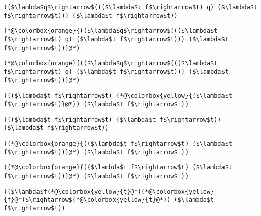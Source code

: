 \documentclass{beamer}
\begin{document}
\begin{frame}[fragile]{\CurrentSection}
\lstset{basicstyle=\ttfamily\small}\lstset{numbers=none}\lstset{language=ML}\begin{lstlisting}
(($\lambda$q$\rightarrow$((($\lambda$t f$\rightarrow$t) q) ($\lambda$t f$\rightarrow$t))) ($\lambda$t f$\rightarrow$t))
\end{lstlisting}
\pause\lstset{language=ML}\begin{lstlisting}
(*@\colorbox{orange}{(($\lambda$q$\rightarrow$((($\lambda$t f$\rightarrow$t) q) ($\lambda$t f$\rightarrow$t))) ($\lambda$t f$\rightarrow$t))}@*)
\end{lstlisting}

\end{frame}

\begin{frame}[fragile]{\CurrentSection}
\lstset{basicstyle=\ttfamily\small}\lstset{numbers=none}\lstset{language=ML}\begin{lstlisting}
(*@\colorbox{orange}{(($\lambda$q$\rightarrow$((($\lambda$t f$\rightarrow$t) q) ($\lambda$t f$\rightarrow$t))) ($\lambda$t f$\rightarrow$t))}@*)
\end{lstlisting}
\pause\lstset{language=ML}\begin{lstlisting}
((($\lambda$t f$\rightarrow$t) (*@\colorbox{yellow}{($\lambda$t f$\rightarrow$t)}@*)) ($\lambda$t f$\rightarrow$t))
\end{lstlisting}

\end{frame}

\begin{frame}[fragile]{\CurrentSection}
\lstset{basicstyle=\ttfamily\small}\lstset{numbers=none}\lstset{language=ML}\begin{lstlisting}
((($\lambda$t f$\rightarrow$t) ($\lambda$t f$\rightarrow$t)) ($\lambda$t f$\rightarrow$t))
\end{lstlisting}
\pause\lstset{language=ML}\begin{lstlisting}
((*@\colorbox{orange}{(($\lambda$t f$\rightarrow$t) ($\lambda$t f$\rightarrow$t))}@*) ($\lambda$t f$\rightarrow$t))
\end{lstlisting}

\end{frame}

\begin{frame}[fragile]{\CurrentSection}
\lstset{basicstyle=\ttfamily\small}\lstset{numbers=none}\lstset{language=ML}\begin{lstlisting}
((*@\colorbox{orange}{(($\lambda$t f$\rightarrow$t) ($\lambda$t f$\rightarrow$t))}@*) ($\lambda$t f$\rightarrow$t))
\end{lstlisting}
\pause\lstset{language=ML}\begin{lstlisting}
(($\lambda$f(*@\colorbox{yellow}{t}@*)(*@\colorbox{yellow}{f}@*)$\rightarrow$(*@\colorbox{yellow}{t}@*)) ($\lambda$t f$\rightarrow$t))
\end{lstlisting}

\end{frame}
\end{document}
